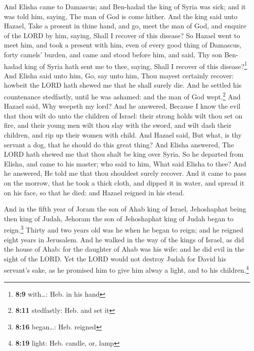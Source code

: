  And Elisha came to Damascus; and Ben-hadad the king of
Syria was sick; and it was told him, saying, The man of God is come
hither.  And the king said unto Hazael, Take a present in
thine hand, and go, meet the man of God, and enquire of the LORD by him,
saying, Shall I recover of this disease?  So Hazael went
to meet him, and took a present with him, even of every good thing of
Damascus, forty camels' burden, and came and stood before him, and said,
Thy son Ben-hadad king of Syria hath sent me to thee, saying, Shall I
recover of this disease?\footnote{\textbf{8:9} with\ldots: Heb. in his
  hand}  And Elisha said unto him, Go, say unto him, Thou
mayest certainly recover: howbeit the LORD hath shewed me that he shall
surely die.  And he settled his countenance stedfastly,
until he was ashamed: and the man of God wept.\footnote{\textbf{8:11}
  stedfastly: Heb. and set it}  And Hazael said, Why
weepeth my lord? And he answered, Because I know the evil that thou wilt
do unto the children of Israel: their strong holds wilt thou set on
fire, and their young men wilt thou slay with the sword, and wilt dash
their children, and rip up their women with child.  And
Hazael said, But what, is thy servant a dog, that he should do this
great thing? And Elisha answered, The LORD hath shewed me that thou
shalt be king over Syria.  So he departed from Elisha,
and came to his master; who said to him, What said Elisha to thee? And
he answered, He told me that thou shouldest surely recover.
 And it came to pass on the morrow, that he took a thick
cloth, and dipped it in water, and spread it on his face, so that he
died: and Hazael reigned in his stead.

 And in the fifth year of Joram the son of Ahab king of
Israel, Jehoshaphat being then king of Judah, Jehoram the son of
Jehoshaphat king of Judah began to reign.\footnote{\textbf{8:16}
  began\ldots: Heb. reigned}  Thirty and two years old
was he when he began to reign; and he reigned eight years in Jerusalem.
 And he walked in the way of the kings of Israel, as did
the house of Ahab: for the daughter of Ahab was his wife: and he did
evil in the sight of the LORD.  Yet the LORD would not
destroy Judah for David his servant's sake, as he promised him to give
him alway a light, and to his children.\footnote{\textbf{8:19} light:
  Heb. candle, or, lamp}

